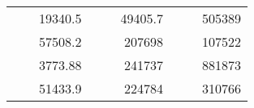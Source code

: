 \begin{table}[H]
\begin{tabular}{|ccrccrccc}
\rowcolor[HTML]{DDFDFF} 
\multicolumn{1}{|c|}{\cellcolor[HTML]{FFFFC7}}                                & \multicolumn{1}{c|}{\cellcolor[HTML]{DDFDFF}}                      & \multicolumn{1}{r|}{\cellcolor[HTML]{DAE8FC}19340.5}   & \multicolumn{1}{c|}{\cellcolor[HTML]{FFFFC7}}                                & \multicolumn{1}{c|}{\cellcolor[HTML]{DDFDFF}}                       & \multicolumn{1}{r|}{\cellcolor[HTML]{DDFDFF}49405.7}   & \multicolumn{1}{c|}{\cellcolor[HTML]{FFFFC7}}                                & \multicolumn{1}{c|}{\cellcolor[HTML]{DDFDFF}}                      & \multicolumn{1}{r|}{\cellcolor[HTML]{DDFDFF}505389}    \\ \cline{3-3} \cline{6-6} \cline{9-9} 
\multicolumn{1}{|c|}{\cellcolor[HTML]{FFFFC7}}                                & \multicolumn{1}{c|}{\cellcolor[HTML]{DDFDFF}}                      & \multicolumn{1}{r|}{\cellcolor[HTML]{DDFDFF}57508.2}   & \multicolumn{1}{c|}{\cellcolor[HTML]{FFFFC7}}                                & \multicolumn{1}{c|}{\cellcolor[HTML]{DDFDFF}}                       & \multicolumn{1}{r|}{\cellcolor[HTML]{DAE8FC}207698}    & \multicolumn{1}{c|}{\cellcolor[HTML]{FFFFC7}}                                & \multicolumn{1}{c|}{\cellcolor[HTML]{DDFDFF}}                      & \multicolumn{1}{r|}{\cellcolor[HTML]{DAE8FC}107522}    \\ \cline{3-3} \cline{6-6} \cline{9-9} 
\rowcolor[HTML]{DDFDFF} 
\multicolumn{1}{|c|}{\cellcolor[HTML]{FFFFC7}}                                & \multicolumn{1}{c|}{\cellcolor[HTML]{DDFDFF}}                      & \multicolumn{1}{r|}{\cellcolor[HTML]{DAE8FC}3773.88}   & \multicolumn{1}{c|}{\cellcolor[HTML]{FFFFC7}}                                & \multicolumn{1}{c|}{\cellcolor[HTML]{DDFDFF}}                       & \multicolumn{1}{r|}{\cellcolor[HTML]{DDFDFF}241737}    & \multicolumn{1}{c|}{\cellcolor[HTML]{FFFFC7}}                                & \multicolumn{1}{c|}{\cellcolor[HTML]{DDFDFF}}                      & \multicolumn{1}{r|}{\cellcolor[HTML]{DDFDFF}881873}    \\ \cline{3-3} \cline{6-6} \cline{9-9} 
\multicolumn{1}{|c|}{\cellcolor[HTML]{FFFFC7}}                                & \multicolumn{1}{c|}{\cellcolor[HTML]{DDFDFF}}                      & \multicolumn{1}{r|}{\cellcolor[HTML]{DDFDFF}51433.9}   & \multicolumn{1}{c|}{\cellcolor[HTML]{FFFFC7}}                                & \multicolumn{1}{c|}{\cellcolor[HTML]{DDFDFF}}                       & \multicolumn{1}{r|}{\cellcolor[HTML]{DAE8FC}224784}    & \multicolumn{1}{c|}{\cellcolor[HTML]{FFFFC7}}                                & \multicolumn{1}{c|}{\cellcolor[HTML]{DDFDFF}}                      & \multicolumn{1}{r|}{\cellcolor[HTML]{DAE8FC}310766}    \\ \cline{3-3} \cline{6-6} \cline{9-9} 

\end{tabular}
\end{table}
